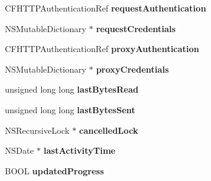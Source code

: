 \begin{DoxyCompactItemize}
\item 
\hypertarget{interface_a_s_i_h_t_t_p_request_af38049645f3c56d1750ecb6cbc608bb2}{
CFHTTPAuthenticationRef {\bfseries requestAuthentication}}
\label{interface_a_s_i_h_t_t_p_request_af38049645f3c56d1750ecb6cbc608bb2}

\item 
\hypertarget{interface_a_s_i_h_t_t_p_request_a670a2b5a3a03e17bfeafaffac01980e2}{
NSMutableDictionary $\ast$ {\bfseries requestCredentials}}
\label{interface_a_s_i_h_t_t_p_request_a670a2b5a3a03e17bfeafaffac01980e2}

\item 
\hypertarget{interface_a_s_i_h_t_t_p_request_aec0b048cf5c5fa2c8ad817d54f9b17ab}{
CFHTTPAuthenticationRef {\bfseries proxyAuthentication}}
\label{interface_a_s_i_h_t_t_p_request_aec0b048cf5c5fa2c8ad817d54f9b17ab}

\item 
\hypertarget{interface_a_s_i_h_t_t_p_request_a6bbee4bd105af8fbee12d5f4602dc8a6}{
NSMutableDictionary $\ast$ {\bfseries proxyCredentials}}
\label{interface_a_s_i_h_t_t_p_request_a6bbee4bd105af8fbee12d5f4602dc8a6}

\item 
\hypertarget{interface_a_s_i_h_t_t_p_request_a2a8e22b7d7e6a869a38d97fa038bef9a}{
unsigned long long {\bfseries lastBytesRead}}
\label{interface_a_s_i_h_t_t_p_request_a2a8e22b7d7e6a869a38d97fa038bef9a}

\item 
\hypertarget{interface_a_s_i_h_t_t_p_request_ad4f78760c1f5fb59653c36fd9c7c209f}{
unsigned long long {\bfseries lastBytesSent}}
\label{interface_a_s_i_h_t_t_p_request_ad4f78760c1f5fb59653c36fd9c7c209f}

\item 
\hypertarget{interface_a_s_i_h_t_t_p_request_ad4ce9473bdf03a2d381690defc2f59bf}{
NSRecursiveLock $\ast$ {\bfseries cancelledLock}}
\label{interface_a_s_i_h_t_t_p_request_ad4ce9473bdf03a2d381690defc2f59bf}

\item 
\hypertarget{interface_a_s_i_h_t_t_p_request_a63b70ac3276c514fdb53202a4d1c6078}{
NSDate $\ast$ {\bfseries lastActivityTime}}
\label{interface_a_s_i_h_t_t_p_request_a63b70ac3276c514fdb53202a4d1c6078}

\item 
\hypertarget{interface_a_s_i_h_t_t_p_request_a5199e38fc372316461df8ba77e2ecdd4}{
BOOL {\bfseries updatedProgress}}
\label{interface_a_s_i_h_t_t_p_request_a5199e38fc372316461df8ba77e2ecdd4}


\end{DoxyCompactItemize}
